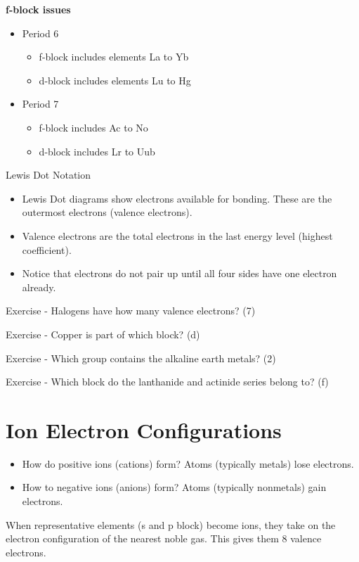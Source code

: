 \documentclass[../hchem.tex]{subfiles}
\begin{document}
\textbf{f-block issues}
\begin{itemize}
    \item Period 6
    \begin{itemize}
        \item f-block includes elements La to Yb
        \item d-block includes elements Lu to Hg 
    \end{itemize}
    \item Period 7
    \begin{itemize}
        \item f-block includes Ac to No 
        \item d-block includes Lr to Uub 
    \end{itemize}
\end{itemize}

Lewis Dot Notation 
\begin{itemize}
    \item Lewis Dot diagrams show electrons available for bonding. These are the outermost electrons (valence electrons).
    \item Valence electrons are the total electrons in the last energy level (highest coefficient).
    \item Notice that electrons do not pair up until all four sides have one electron already.
\end{itemize}

Exercise - Halogens have how many valence electrons? (7)

Exercise - Copper is part of which block? (d)

Exercise - Which group contains the alkaline earth metals? (2)

Exercise - Which block do the lanthanide and actinide series belong to? (f)
\section{Ion Electron Configurations}
\begin{itemize}
    \item How do positive ions (cations) form?
    Atoms (typically metals) lose electrons.

    \item How to negative ions (anions) form?
    Atoms (typically nonmetals) gain electrons. 
\end{itemize}

When representative elements (s and p block) become ions, they take on the electron 
configuration of the nearest noble gas. This gives them 8 valence electrons.
\end{document}
